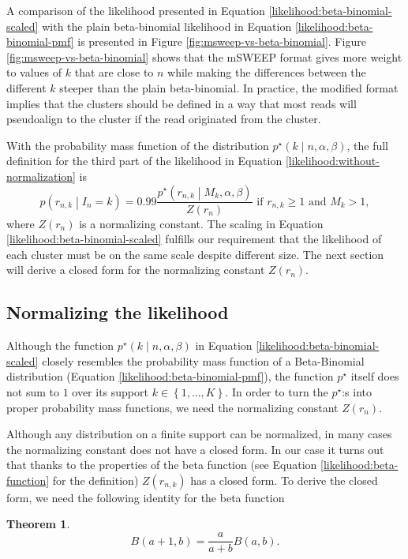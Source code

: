 \documentclass[officiallayout]{tktla}
\newtheorem{theorem}{Theorem}[chapter]
\begin{document}
A comparison of the likelihood presented in Equation
\ref{likelihood:beta-binomial-scaled} with the plain beta-binomial
likelihood in Equation \ref{likelihood:beta-binomial-pmf} is presented
in Figure \ref{fig:msweep-vs-beta-binomial}. Figure
\ref{fig:msweep-vs-beta-binomial} shows that the mSWEEP format gives
more weight to values of $k$ that are close to $n$ while making the
differences between the different $k$ steeper than the plain
beta-binomial. In practice, the modified format implies that the
clusters should be defined in a way that most reads will pseudoalign
to the cluster if the read originated from the cluster.

With the probability mass function of the distribution
$p^{\star}\left(k \middle| n, \alpha, \beta\right)$, the full
definition for the third part of the likelihood in Equation \ref{likelihood:without-normalization} is
\begin{equation}
  \label{likelihood:normalized}
  p\left(r_{n, k} \middle| I_{n} = k\right) = 0.99\frac{p^{\star}\left(r_{n, k} \middle| M_{k}, \alpha, \beta\right)}{Z\left(r_{n}\right)}\text{ if } r_{n, k} \geq 1\text{ and } M_{k} > 1,
\end{equation}
where $Z\left(r_{n}\right)$ is a normalizing constant. The
scaling in Equation \ref{likelihood:beta-binomial-scaled} fulfills our
requirement that the likelihood of each cluster must be on the same
scale despite different size. The next section will derive a closed
form for the normalizing constant $Z\left(r_{n}\right)$.

\subsection{Normalizing the likelihood}

Although the function $p^{\star}\left(k \middle| n, \alpha,
\beta\right)$ in Equation \ref{likelihood:beta-binomial-scaled}
closely resembles the probability mass function of a Beta-Binomial
distribution (Equation \ref{likelihood:beta-binomial-pmf}), the
function $p^{\star}$ itself does not sum to $1$ over its support $k
\in \left\{ 1, \dots, K \right\}$. In order to turn the $p^{\star}$:s
into proper probability mass functions, we need the normalizing
constant $Z\left(r_{n}\right)$.

Although any distribution on a finite support can be normalized, in
many cases the normalizing constant does not have a closed form. In
our case it turns out that \textemdash thanks to the properties of the
beta function (see Equation \ref{likelihood:beta-function} for the
definition) \textemdash $Z\left(r_{n, k}\right)$ has a closed form. To
derive the closed form, we need the following identity for the beta
function
\begin{theorem}
  \label{lemma:beta-function-identity}
  \[
  B\left(a + 1, b\right) = \frac{a}{a + b}B\left(a, b\right).
  \]
\end{theorem}
\end{document}
